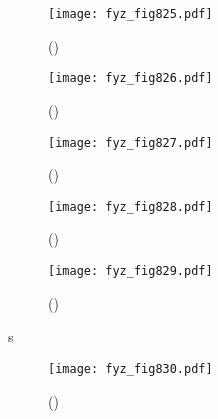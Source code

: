     \begin{figure}[ht!] %
      \centering
      \texttt{[image: fyz\_fig825.pdf]}
      \caption{
               (\cite[s.~707]{Feynman02})}
      \label{fyz_fig825}
    \end{figure}

    \begin{figure}[ht!] %
      \centering
      \texttt{[image: fyz\_fig826.pdf]}
      \caption{
               (\cite[s.~707]{Feynman02})}
      \label{fyz_fig826}
    \end{figure}

    \begin{figure}[ht!] %
      \centering
      \texttt{[image: fyz\_fig827.pdf]}
      \caption{
               (\cite[s.~707]{Feynman02})}
      \label{fyz_fig827}
    \end{figure}

    \begin{figure}[ht!] %
      \centering
      \texttt{[image: fyz\_fig828.pdf]}
      \caption{
               (\cite[s.~707]{Feynman02})}
      \label{fyz_fig828}
    \end{figure}

    \begin{figure}[ht!] %
      \centering
      \texttt{[image: fyz\_fig829.pdf]}
      \caption{
               (\cite[s.~707]{Feynman02})}
      \label{fyz_fig829}
    \end{figure}
s
    \begin{figure}[ht!] %
      \centering
      \texttt{[image: fyz\_fig830.pdf]}
      \caption{
               (\cite[s.~707]{Feynman02})}
      \label{fyz_fig830}
    \end{figure}

\printbibliography[title={Seznam literatury},heading=subbibliography]
